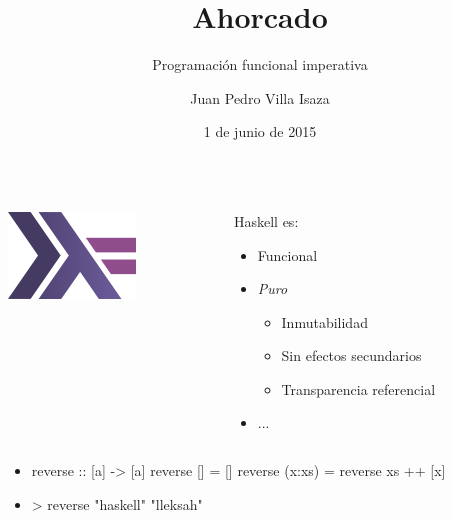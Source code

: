 \documentclass[spanish]{beamer}
\title{Ahorcado}
\subtitle{Programación funcional imperativa}
\author{Juan Pedro Villa Isaza}
\institute{Stack Builders}
\date{1 de junio de 2015}
\begin{document}

\frame{\titlepage}


\begin{frame}
  \begin{columns}[onlytextwidth,T]
    \begin{column}{.5\textwidth}
      \begin{center}
        \includegraphics[scale=0.8]{haskell.png}
      \end{center}
    \end{column}
    \begin{column}{.5\textwidth}
      Haskell es:
      \begin{itemize}
      \item Funcional
      \item \emph{Puro}
        \begin{itemize}
        \item Inmutabilidad
        \item Sin efectos secundarios
        \item Transparencia referencial
        \end{itemize}
      \item<1-> ...
      \end{itemize}
    \end{column}
  \end{columns}
\end{frame}


\begin{frame}[fragile]
  \begin{itemize}
  \item
    \begin{code}
reverse :: [a] -> [a]
reverse []     = []
reverse (x:xs) = reverse xs ++ [x]
    \end{code}
  \item
    \begin{code}
> reverse "haskell"
"lleksah"
    \end{code}
  \end{itemize}
\end{frame}
\end{document}
